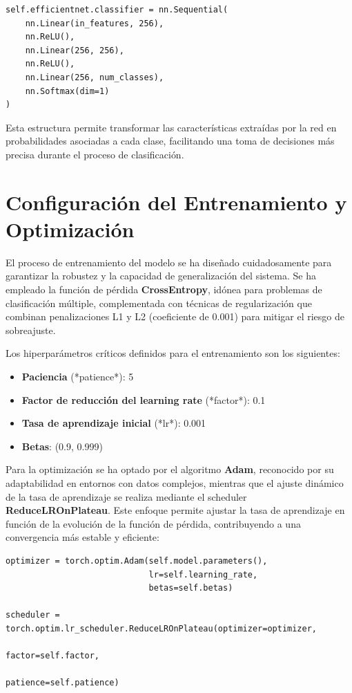 \documentclass[11pt,spanish,listoffigures,listoftables]{tfgetsinf}
\begin{document}
\begin{verbatim}
self.efficientnet.classifier = nn.Sequential(
    nn.Linear(in_features, 256),
    nn.ReLU(),
    nn.Linear(256, 256),
    nn.ReLU(),
    nn.Linear(256, num_classes),
    nn.Softmax(dim=1)
)
\end{verbatim}

Esta estructura permite transformar las características extraídas por la red en probabilidades asociadas a cada clase, facilitando una toma de decisiones más precisa durante el proceso de clasificación.

\section{Configuración del Entrenamiento y Optimización}
El proceso de entrenamiento del modelo se ha diseñado cuidadosamente para garantizar la robustez y la capacidad de generalización del sistema. Se ha empleado la función de pérdida \textbf{CrossEntropy}, idónea para problemas de clasificación múltiple, complementada con técnicas de regularización que combinan penalizaciones L1 y L2 (coeficiente de 0.001) para mitigar el riesgo de sobreajuste.

Los hiperparámetros críticos definidos para el entrenamiento son los siguientes:
\begin{itemize}
    \item \textbf{Paciencia} (*patience*): 5
    \item \textbf{Factor de reducción del learning rate} (*factor*): 0.1
    \item \textbf{Tasa de aprendizaje inicial} (*lr*): 0.001
    \item \textbf{Betas}: (0.9, 0.999)
\end{itemize}

Para la optimización se ha optado por el algoritmo \textbf{Adam}, reconocido por su adaptabilidad en entornos con datos complejos, mientras que el ajuste dinámico de la tasa de aprendizaje se realiza mediante el scheduler \textbf{ReduceLROnPlateau}. Este enfoque permite ajustar la tasa de aprendizaje en función de la evolución de la función de pérdida, contribuyendo a una convergencia más estable y eficiente:

\begin{verbatim}
optimizer = torch.optim.Adam(self.model.parameters(),
                             lr=self.learning_rate,
                             betas=self.betas)

scheduler = torch.optim.lr_scheduler.ReduceLROnPlateau(optimizer=optimizer,
                                                       factor=self.factor,
                                                       patience=self.patience)
\end{verbatim}
\end{document}
